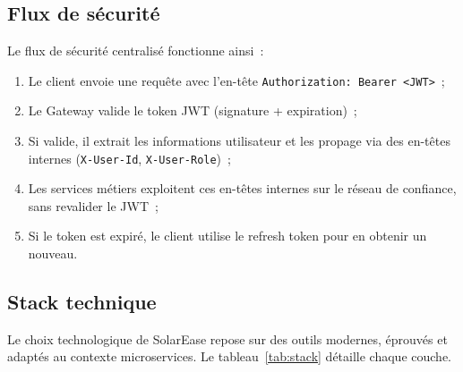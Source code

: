 \subsection{Flux de sécurité}

Le flux de sécurité centralisé fonctionne ainsi~:
\begin{enumerate}
  \item Le client envoie une requête avec l'en-tête \texttt{Authorization: Bearer <JWT>}~;
  \item Le Gateway valide le token JWT (signature + expiration)~;
  \item Si valide, il extrait les informations utilisateur et les propage
    via des en-têtes internes (\texttt{X-User-Id}, \texttt{X-User-Role})~;
  \item Les services métiers exploitent ces en-têtes internes sur le réseau de confiance, sans revalider le JWT~;
  \item Si le token est expiré, le client utilise le refresh token pour en obtenir un nouveau.
\end{enumerate}

\subsection{Stack technique}

Le choix technologique de SolarEase repose sur des outils modernes, éprouvés
et adaptés au contexte microservices. Le tableau~\ref{tab:stack} détaille
chaque couche.

